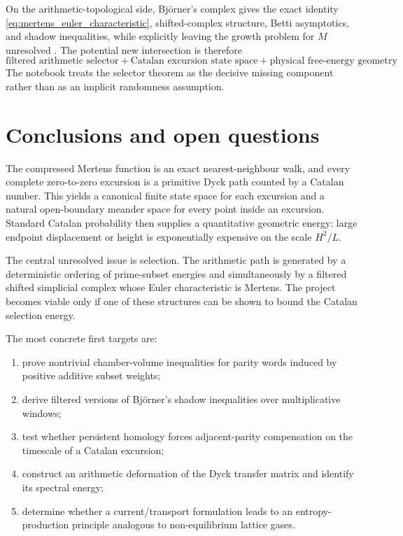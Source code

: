 \documentclass[11pt]{amsart}
\numberwithin{equation}{section}
\theoremstyle{plain}
\theoremstyle{definition}
\theoremstyle{remark}
\newcommand{\Mert}{M}
\begin{document}
On the arithmetic-topological side, Bj\"orner's complex gives the exact identity \eqref{eq:mertens_euler_characteristic}, shifted-complex structure, Betti asymptotics, and shadow inequalities, while explicitly leaving the growth problem for $\Mert$ unresolved \cite{Bjorner2011}.  The potential new intersection is therefore
\begin{equation}
\boxed{
\text{filtered arithmetic selector}
+
\text{Catalan excursion state space}
+
\text{physical free-energy geometry}
}.
\label{eq:literature_intersection}
\end{equation}
The notebook treats the selector theorem as the decisive missing component rather than as an implicit randomness assumption.

\section{Conclusions and open questions}
\label{sec:conclusions}

The compressed Mertens function is an exact nearest-neighbour walk, and every complete zero-to-zero excursion is a primitive Dyck path counted by a Catalan number.  This yields a canonical finite state space for each excursion and a natural open-boundary meander space for every point inside an excursion.  Standard Catalan probability then supplies a quantitative geometric energy: large endpoint displacement or height is exponentially expensive on the scale $H^2/L$.

The central unresolved issue is selection.  The arithmetic path is generated by a deterministic ordering of prime-subset energies and simultaneously by a filtered shifted simplicial complex whose Euler characteristic is Mertens.  The project becomes viable only if one of these structures can be shown to bound the Catalan selection energy.

The most concrete first targets are:
\begin{enumerate}[label=(\roman*)]
\item prove nontrivial chamber-volume inequalities for parity words induced by positive additive subset weights;
\item derive filtered versions of Bj\"orner's shadow inequalities over multiplicative windows;
\item test whether persistent homology forces adjacent-parity compensation on the timescale of a Catalan excursion;
\item construct an arithmetic deformation of the Dyck transfer matrix and identify its spectral energy;
\item determine whether a current/transport formulation leads to an entropy-production principle analogous to non-equilibrium lattice gases.
\end{enumerate}
\end{document}
